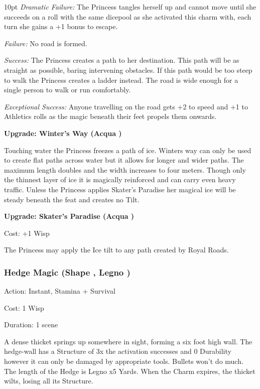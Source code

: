 \begin{myindentpar}{10pt} \emph{Dramatic Failure:} The Princess tangles herself up and cannot move until she succeeds on a roll with the same dicepool as she activated this charm with, each turn she gains a +1 bonus to escape.
 
\emph{Failure:} No road is formed.

\emph{Success:} The Princess creates a path to her destination. This path will be as straight as possible, baring intervening obstacles. If this path would be too steep to walk the Princess creates a ladder instead. The road is wide enough for a single person to walk or run comfortably.

\emph{Exceptional Success:} Anyone travelling on the road gets +2 to speed and +1 to Athletics rolls as the magic beneath their feet propels them onwards.

\textbf{Upgrade: Winter's Way (Acqua \textbullet\textbullet\textbullet)}

Touching water the Princess freezes a path of ice. Winters way can only be used to create flat paths across water but it allows for longer and wider paths. The maximum length doubles and the width increases to four meters. Though only the thinnest layer of ice it is magically reinforced and can carry even heavy traffic. Unless the Princess applies Skater's Paradise her magical ice will be steady beneath the feat and creates no Tilt. 

\textbf{Upgrade: Skater's Paradise (Acqua \textbullet\textbullet\textbullet)}

Cost: +1 Wisp

The Princess may apply the Ice tilt to any path created by Royal Roads.\end{myindentpar}

\subsubsection*{Hedge Magic (Shape \textbullet\textbullet, Legno \textbullet)}

\noindent Action: Instant, Stamina + Survival

\noindent Cost: 1 Wisp

\noindent Duration: 1 scene

A dense thicket springs up somewhere in sight, forming a six foot high wall. The hedge-wall has a Structure of 3x the activation successes and 0 Durability however it can only be damaged by appropriate tools. Bullets won't do much. The length of the Hedge is Legno x5 Yards. When the Charm expires, the thicket wilts, losing all its Structure.

